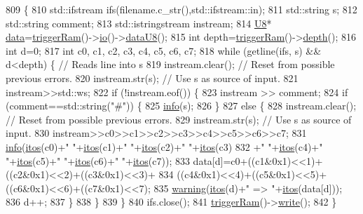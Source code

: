 \begin{DoxyCode}
809                                         \{
810   std::ifstream ifs(filename.c\_str(),std::ifstream::in);
811   std::string s;
812   std::string comment;
813   std::istringstream instream;
814   \hyperlink{ICECALv3_8h_a3cb25ca6f51f003950f9625ff05536fc}{U8}* \hyperlink{namespaceshell_a5ea2525995cedc3efd69ea8a7f034d1e}{data}=\hyperlink{classA3PE_aad0f7ac467db22e5608ae6b0957665a1}{triggerRam}()->\hyperlink{classIOobject_af04fb94137c3d86849f478ac5afab5d1}{io}()->\hyperlink{classIOdata_a75e9c318dbac3a39402179070943d4bc}{dataU8}();
815   \textcolor{keywordtype}{int} depth=\hyperlink{classA3PE_aad0f7ac467db22e5608ae6b0957665a1}{triggerRam}()->\hyperlink{classRAM_aa36cbedb8a970a01ee07a9637553887f}{depth}();
816   \textcolor{keywordtype}{int} d=0;
817   \textcolor{keywordtype}{int} c0, c1, c2, c3, c4, c5, c6, c7;
818   \textcolor{keywordflow}{while} (getline(ifs, s) && d<depth) \{ \textcolor{comment}{// Reads line into s}
819       instream.clear();     \textcolor{comment}{// Reset from possible previous errors.}
820       instream.str(s);      \textcolor{comment}{// Use s as source of input.}
821       instream>>std::ws;
822       \textcolor{keywordflow}{if} (!instream.eof()) \{
823         instream >> comment;
824         \textcolor{keywordflow}{if} (comment==std::string(\textcolor{stringliteral}{"#"})) \{
825           \hyperlink{classObject_a644fd329ea4cb85f54fa6846484b84a8}{info}(s);
826         \}
827         \textcolor{keywordflow}{else} \{
828           instream.clear();     \textcolor{comment}{// Reset from possible previous errors.}
829           instream.str(s);      \textcolor{comment}{// Use s as source of input.}
830           instream>>c0>>c1>>c2>>c3>>c4>>c5>>c6>>c7;
831           \hyperlink{classObject_a644fd329ea4cb85f54fa6846484b84a8}{info}(\hyperlink{Tools_8h_af330027dbdafb9a30768b3613c553e60}{itos}(c0)+\textcolor{stringliteral}{" "}+\hyperlink{Tools_8h_af330027dbdafb9a30768b3613c553e60}{itos}(c1)+\textcolor{stringliteral}{" "}+\hyperlink{Tools_8h_af330027dbdafb9a30768b3613c553e60}{itos}(c2)+\textcolor{stringliteral}{" "}+\hyperlink{Tools_8h_af330027dbdafb9a30768b3613c553e60}{itos}(c3)
832               +\textcolor{stringliteral}{" "}+\hyperlink{Tools_8h_af330027dbdafb9a30768b3613c553e60}{itos}(c4)+\textcolor{stringliteral}{" "}+\hyperlink{Tools_8h_af330027dbdafb9a30768b3613c553e60}{itos}(c5)+\textcolor{stringliteral}{" "}+\hyperlink{Tools_8h_af330027dbdafb9a30768b3613c553e60}{itos}(c6)+\textcolor{stringliteral}{" "}+\hyperlink{Tools_8h_af330027dbdafb9a30768b3613c553e60}{itos}(c7));
833           data[d]=c0+((c1&0x1)<<1)+((c2&0x1)<<2)+((c3&0x1)<<3)+
834               ((c4&0x1)<<4)+((c5&0x1)<<5)+((c6&0x1)<<6)+((c7&0x1)<<7);
835           \hyperlink{classObject_a65cd4fda577711660821fd2cd5a3b4c9}{warning}(\hyperlink{Tools_8h_af330027dbdafb9a30768b3613c553e60}{itos}(d)+\textcolor{stringliteral}{" => "}+\hyperlink{Tools_8h_af330027dbdafb9a30768b3613c553e60}{itos}(data[d]));
836           d++;
837         \}
838       \}
839   \}
840   ifs.close();
841   \hyperlink{classA3PE_aad0f7ac467db22e5608ae6b0957665a1}{triggerRam}()->\hyperlink{classIOobject_a9f6984bc9f0fadcf800f1be2523ac744}{write}();
842 \}
\end{DoxyCode}
